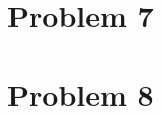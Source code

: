 \documentclass[11pt,letterpaper]{article}
\begin{document}
\begin{enumerate}[(a)]
\end{enumerate}
\clearpage

\section*{Problem 7}

\section*{Problem 8}
\end{document}
